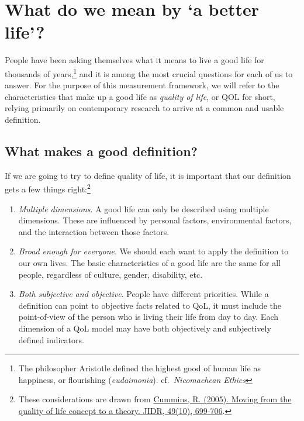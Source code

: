 \documentclass[
]{book}
\providecommand{\tightlist}{%
  \setlength{\itemsep}{0pt}\setlength{\parskip}{0pt}}
\begin{document}
\hypertarget{what-do-we-mean-by-a-better-life}{%
\section{What do we mean by `a better life'?}\label{what-do-we-mean-by-a-better-life}}

People have been asking themselves what it means to live a good life for thousands of years,\footnote{The philosopher Aristotle defined the highest good of human life as happiness, or flourishing (\emph{eudaimonia}). cf.~\emph{Nicomachean Ethics}} and it is among the most crucial questions for each of us to answer. For the purpose of this measurement framework, we will refer to the characteristics that make up a good life as \emph{quality of life}, or QOL for short, relying primarily on contemporary research to arrive at a common and usable definition.

\hypertarget{what-makes-a-good-definition}{%
\subsection{What makes a good definition?}\label{what-makes-a-good-definition}}

If we are going to try to define quality of life, it is important that our definition gets a few things right:\footnote{These considerations are drawn from \href{https://www.ncbi.nlm.nih.gov/pubmed/16162114}{Cummins, R. (2005). Moving from the quality of life concept to a theory. JIDR, 49(10), 699-706}.}

\begin{enumerate}
\def\labelenumi{\arabic{enumi}.}
\tightlist
\item
  \emph{Multiple dimensions}. A good life can only be described using multiple dimensions. These are influenced by personal factors, environmental factors, and the interaction between those factors.
\item
  \emph{Broad enough for everyone}. We should each want to apply the definition to our own lives. The basic characteristics of a good life are the same for all people, regardless of culture, gender, disability, etc.
\item
  \emph{Both subjective and objective}. People have different priorities. While a definition can point to objective facts related to QoL, it must include the point-of-view of the person who is living their life from day to day. Each dimension of a QoL model may have both objectively and subjectively defined indicators.
\end{enumerate}
\end{document}
